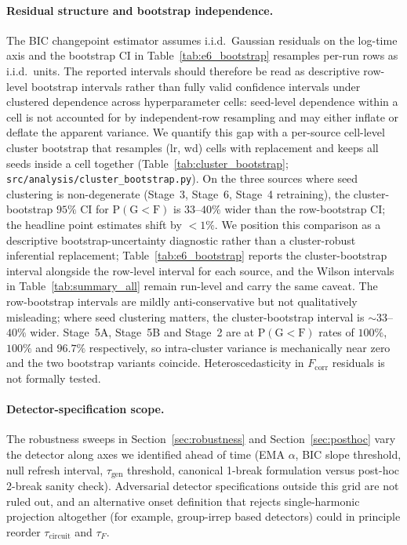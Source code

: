 \documentclass{article}
\newcommand{\taug}{\tau_{\mathrm{gen}}}
\newcommand{\tauf}{\tau_{F}}
\newcommand{\taucirc}{\tau_{\mathrm{circuit}}}
\newcommand{\fcorr}{F_{\mathrm{corr}}}
\begin{document}
\paragraph{Residual structure and bootstrap independence.}
The BIC changepoint estimator assumes i.i.d.\ Gaussian residuals on
the log-time axis and the bootstrap CI in
Table~\ref{tab:e6_bootstrap} resamples per-run rows as i.i.d.\
units.
The reported intervals should therefore be read as descriptive
row-level bootstrap intervals rather than fully valid confidence
intervals under clustered dependence across hyperparameter cells:
seed-level dependence within a cell is not accounted for by
independent-row resampling and may either inflate or deflate the
apparent variance.
We quantify this gap with a per-source cell-level cluster
bootstrap that resamples (lr, wd) cells with replacement and
keeps all seeds inside a cell together
(Table~\ref{tab:cluster_bootstrap};
\texttt{src/analysis/cluster\_bootstrap.py}).
On the three sources where seed clustering is non-degenerate
(Stage~3, Stage~6, Stage~4 retraining), the cluster-bootstrap
$95\%$ CI for $\mathrm{P}(\mathrm{G}{<}\mathrm{F})$ is $33$--$40\%$
wider than the row-bootstrap CI; the headline point estimates
shift by $<1\%$.
We position this comparison as a descriptive bootstrap-uncertainty
diagnostic rather than a cluster-robust inferential replacement;
Table~\ref{tab:e6_bootstrap} reports the cluster-bootstrap
interval alongside the row-level interval for each source, and
the Wilson intervals in Table~\ref{tab:summary_all} remain
run-level and carry the same caveat.
The row-bootstrap intervals are mildly anti-conservative but not
qualitatively misleading; where seed clustering matters, the
cluster-bootstrap interval is $\sim$$33$--$40\%$ wider.
Stage~5A, Stage~5B and Stage~2 are at $\mathrm{P}(\mathrm{G}{<}\mathrm{F})$
rates of $100\%$, $100\%$ and $96.7\%$ respectively, so
intra-cluster variance is mechanically near zero and the two
bootstrap variants coincide.
Heteroscedasticity in $\fcorr$ residuals is not formally tested.

\paragraph{Detector-specification scope.}
The robustness sweeps in Section~\ref{sec:robustness} and
Section~\ref{sec:posthoc} vary the detector along axes we
identified ahead of time (EMA $\alpha$, BIC slope threshold, null
refresh interval, $\taug$ threshold, canonical 1-break formulation versus post-hoc 2-break sanity check).
Adversarial detector specifications outside this grid are not
ruled out, and an alternative onset definition that rejects
single-harmonic projection altogether (for example, group-irrep
based detectors) could in principle reorder $\taucirc$ and $\tauf$.
\end{document}

